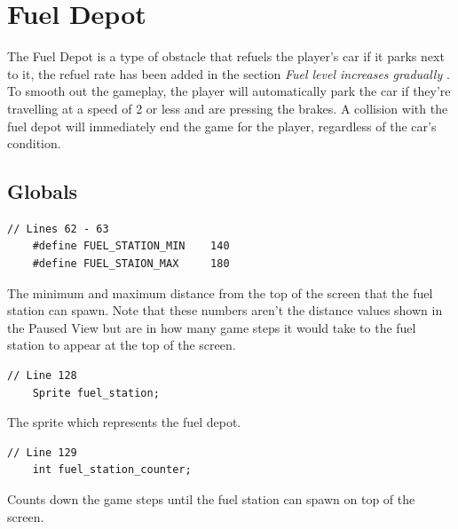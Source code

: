 \documentclass{article}
\begin{document}
\section{Fuel Depot}
The Fuel Depot is a type of obstacle that refuels the player's car if it parks next to it, the refuel rate has been added in the section \emph{Fuel level increases gradually }. To smooth out the gameplay, the player will automatically park the car if they're travelling at a speed of 2 or less and are pressing the brakes. A collision with the fuel depot will immediately end the game for the player, regardless of the car's condition.

\subsection*{Globals}
\begin{lstlisting}[style=CStyle]
	// Lines 62 - 63
	#define FUEL_STATION_MIN    140    
	#define FUEL_STAION_MAX     180
\end{lstlisting}
The minimum and maximum distance from the top of the screen that the fuel station can spawn. Note that these numbers aren't the distance values shown in the Paused View but are in how many game steps it would take to the fuel station to appear at the top of the screen.
\begin{lstlisting}[style=CStyle]
	// Line 128
	Sprite fuel_station;
\end{lstlisting}
The sprite which represents the fuel depot.
\begin{lstlisting}[style=CStyle]
	// Line 129
	int fuel_station_counter; 
\end{lstlisting}
Counts down the game steps until the fuel station can spawn on top of the screen.
\newline
\end{document}
